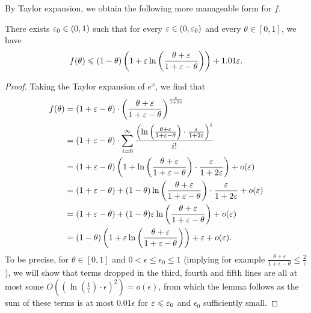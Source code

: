 By Taylor expansion, we obtain the following more manageable form for $f$.
\begin{lem}
	\label{lm:taylor}
	There exists $\varepsilon_0\in (0,1)$ such that for every $\varepsilon\in (0,\varepsilon_0)$ and every $\theta\in [0,1]$, we have
	\begin{align*}
	f(\theta) \leqslant (1 - \theta) \left(1+\varepsilon
	\ln\left(\frac{\theta+\varepsilon}{1+\varepsilon-\theta} \right)\right) + 1.01\varepsilon.
	\end{align*}
\end{lem}
\begin{proof} 
	Taking the Taylor expansion of $e^x$, we find that
	\begin{equation*}
	\begin{split}
	f(\theta) & = \left(1+ \varepsilon - \theta\right) \cdot \left(
	\frac{\theta+\varepsilon}{1+\varepsilon-\theta}
	\right)^{\frac{\varepsilon}{1+2\varepsilon}}\\
	& = 
	\left(1+ \varepsilon - \theta \right) \cdot \sum_{i=0}^\infty 
	\frac{
		\left( \ln \left(\frac{\theta + \varepsilon}{1+ \varepsilon - \theta}\right) 
		\cdot \frac{\varepsilon}{1+2\varepsilon}
		\right)^i
	}{i!} \\
	& = (1+\varepsilon - \theta) \left(1+ \ln \left(\frac{\theta+\varepsilon}{1+ \varepsilon - \theta} \right) \cdot\frac{\varepsilon}{1+2\varepsilon}\right)  +  o(\varepsilon) \\
	& = (1+\varepsilon - \theta ) + (1-\theta) \ln \left(\frac{\theta+\varepsilon}{1+ \varepsilon - \theta} \right) \cdot\frac{\varepsilon}{1+2\varepsilon} + o(\varepsilon) \\
	& = (1+\varepsilon - \theta ) + (1- \theta) \varepsilon
	\ln\left(\frac{\theta+\varepsilon}{1+\varepsilon-\theta} \right) + o(\varepsilon)\\
	& = (1 - \theta )\left(1 + \varepsilon
	\ln\left(\frac{\theta+\varepsilon}{1+\varepsilon-\theta} \right)\right) +\varepsilon+ o(\varepsilon).	
	\end{split}
	\end{equation*}
	To be precise, for $\theta\in [0,1]$ and $0 < \epsilon\leq \epsilon_0\leq 1$ (implying for example $\frac{\theta+\epsilon}{1+\epsilon-\theta} \leq \frac{2}{\epsilon}$), we will show that terms dropped in the third, fourth and fifth lines are all
	at most some $O((\ln(\frac{1}{\epsilon})\cdot \epsilon)^2) = o(\epsilon)$, from which the lemma follows as the sum of these terms is at most $0.01\epsilon$ for $\varepsilon\leqslant \varepsilon_0$ and $\epsilon_0$ sufficiently small.
	

\end{proof}
